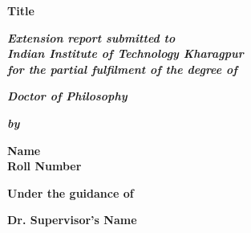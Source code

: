 \documentclass[a4paper,twoside,12pt]{article}
\begin{document}
	\thispagestyle{empty}
	\begin{center}
		\textbf{\Large Title}
	\end{center}
	\vspace{2em}
	\begin{center}
		\textbf{\textit{Extension report submitted to \\Indian Institute of Technology Kharagpur \\for the partial fulfilment of the degree of}}
	\end{center}
	\vspace{1em}
	\begin{center}
		\large\textbf{\textit{Doctor of Philosophy}}
	\end{center}
	\vspace{-3em}
	\begin{center}
		\textbf{\textit{}}
	\end{center}
	\vspace{-1em}
	\vspace{-1em}
	\vspace{2em}
	\begin{center}
		\textbf{\textit{by}}
	\end{center}
	\vspace{0em}
	\begin{center}
		\large{\textbf{Name\\Roll Number}}
	\end{center}
	\vspace{0em}
	\begin{center}
	\textbf{Under the guidance of}
	\end{center}
	\vspace{-1em}
	\begin{center}
		\large\textbf{Dr. Supervisor's Name}
	\end{center} 
\end{document}
